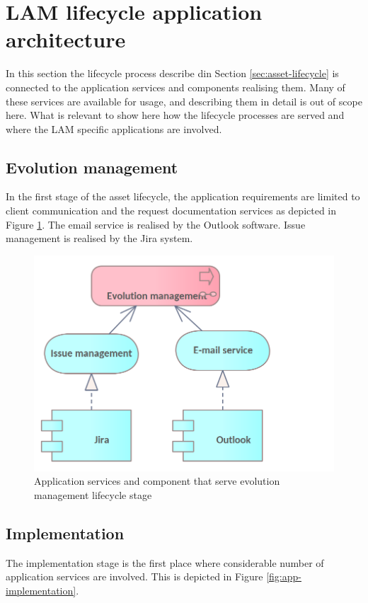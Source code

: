 	\section{LAM lifecycle application architecture}
	\label{sec:application-lifecycle}
	
	In this section the lifecycle process describe din Section \ref{sec:asset-lifecycle} is connected to the application services and components realising them. Many of these services are available for usage, and describing them in detail is out of scope here. What is relevant to show here how the lifecycle processes are served and where the LAM specific applications are involved.
	
	\subsection{Evolution management}
	
	In the first stage of the asset lifecycle, the application requirements are limited to client
communication and the request documentation services as depicted in Figure \ref{fig:app-evolution-management}. The email service is realised by the Outlook software. Issue management is realised by the Jira system.
	
    \begin{figure}[!h]
		\centering
		\includegraphics[width=.45\textwidth]{images/application/lifecycle/Evolution.png}
		\caption{Application services and component that serve evolution management lifecycle stage}
		\label{fig:app-evolution-management}
	\end{figure}

	
	\subsection{Implementation}
	\label{sec:implementation}
	
	The implementation stage is the first place where considerable number of application services are involved. This is depicted in Figure \ref{fig:app-implementation}. 
	
